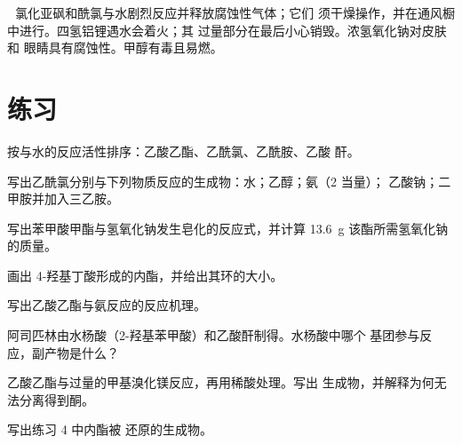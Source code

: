 \begin{safety}{\,\,}
氯化亚砜和酰氯与水剧烈反应并释放腐蚀性气体；它们
须干燥操作，并在通风橱中进行。四氢铝锂遇水会着火；其
过量部分在最后小心销毁。浓氢氧化钠对皮肤和
眼睛具有腐蚀性。甲醇有毒且易燃。
\end{safety}

\section{练习}

\begin{exercise}[$\star$]\label{exo:b2:acyl-substitution:1}
按与水的反应活性排序：乙酸乙酯、乙酰氯、乙酰胺、乙酸
酐。
\end{exercise}

\begin{exercise}[$\star$]\label{exo:b2:acyl-substitution:2}
写出乙酰氯分别与下列物质反应的生成物：水；乙醇；氨（2 当量）；
乙酸钠；二甲胺并加入三乙胺。
\end{exercise}

\begin{exercise}[$\star$]\label{exo:b2:acyl-substitution:3}
写出苯甲酸甲酯与氢氧化钠发生皂化的反应式，并计算
\qty{13.6}{g} 该酯所需氢氧化钠的质量。
\end{exercise}

\begin{exercise}[$\star$]\label{exo:b2:acyl-substitution:4}
画出 4-羟基丁酸形成的内酯，并给出其环的大小。
\end{exercise}

\begin{exercise}[$\star\star$]\label{exo:b2:acyl-substitution:5}
写出乙酸乙酯与氨反应的反应机理。
\end{exercise}

\begin{exercise}[$\star\star$]\label{exo:b2:acyl-substitution:6}
阿司匹林由水杨酸（2-羟基苯甲酸）和乙酸酐制得。水杨酸中哪个
基团参与反应，副产物是什么？
\end{exercise}

\begin{exercise}[$\star\star$]\label{exo:b2:acyl-substitution:7}
乙酸乙酯与过量的甲基溴化镁反应，再用稀酸处理。写出
生成物，并解释为何无法分离得到酮。
\end{exercise}

\begin{exercise}[$\star\star$]\label{exo:b2:acyl-substitution:8}
写出练习 4 中内酯被  还原的生成物。
\end{exercise}

